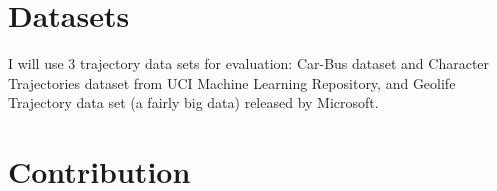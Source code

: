 \documentclass[10pt, twocolumn]{myclass}
\begin{document}
\section{Datasets}

I will use 3 trajectory data sets for evaluation: Car-Bus dataset and Character Trajectories dataset from UCI Machine Learning Repository, and Geolife Trajectory data set (a fairly big data) released by Microsoft.








\section{Contribution}
\end{document}
